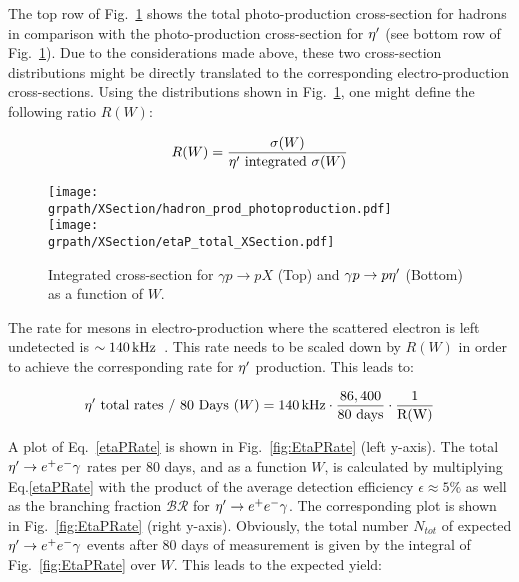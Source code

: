 \FloatBarrier

The top row of Fig.~\ref{fig:EtaPProdX} shows the total photo-production cross-section for hadrons in comparison with the photo-production cross-section for $\eta^{\prime}$ (see bottom row of Fig.~\ref{fig:EtaPProdX}). Due to the considerations made above, these two cross-section distributions might be directly translated to the corresponding electro-production cross-sections. Using the distributions shown in Fig.~\ref{fig:EtaPProdX}, one might define the following ratio $R(W)$:

\begin{equation}
 R(W) = \frac{\sigma(W)}{\eta^{\prime}\text{ integrated } \sigma(W)}
\label{XsecR}
\end{equation}

\begin{figure}[h!]\begin{center}
		\texttt{[image: \\grpath/XSection/hadron\_prod\_photoproduction.pdf]}\\
		\texttt{[image: \\grpath/XSection/etaP\_total\_XSection.pdf]}
		\caption[etaP phot-prod. XSection]{\label{fig:EtaPProdX}{Integrated cross-section for $\gamma p\rightarrow pX$ (Top) and $\gamma p\rightarrow p\eta^{\prime}$ (Bottom) as a function of $W$.}}
\end{center}\end{figure}

The rate for mesons in electro-production where the scattered electron is left undetected is $\sim 140\,\rm{kHz}$~\cite{Sargsyan}. This rate needs to be scaled down by $R(W)$ in order to achieve the corresponding rate for $\eta^{\prime}$ production. This leads to:

\begin{equation}
 \eta^{\prime}\text{ total rates / 80 Days }(W) = 140\,\rm{kHz}\cdot \frac{86,400}{\text{80 days}}\cdot \frac{1}{R(W)}
\label{etaPRate}
\end{equation}

A plot of Eq.~\ref{etaPRate} is shown in Fig.~\ref{fig:EtaPRate} (left y-axis). The total $\eta^{\prime}\rightarrow e^+e^-\gamma$ rates per 80 days, and as a function $W$, is calculated by multiplying Eq.\ref{etaPRate} with the product of the average detection efficiency $\epsilon\approx 5\%$ as well as the branching fraction $\mathcal{BR} $ for $\eta^{\prime}\rightarrow e^+e^-\gamma$. The corresponding plot is shown in Fig.~\ref{fig:EtaPRate} (right y-axis). Obviously, the total number $N_{tot}$ of expected $\eta^{\prime}\rightarrow e^+e^-\gamma$ events after 80 days of measurement is given by the integral of Fig.~\ref{fig:EtaPRate} over $W$. This leads to the expected yield:

